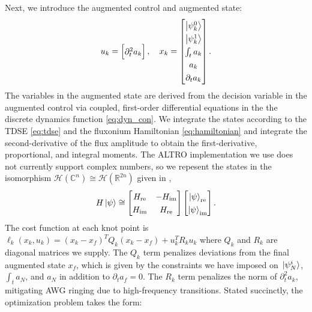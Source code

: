 Next, we introduce the augmented control and augmented state:
\begin{equation}
  \begingroup
  \renewcommand*{\arraystretch}{1.3}
  u_{k} = \begin{bmatrix} \partial^{2}_{t} a_{k} \end{bmatrix}, \quad
  x_{k} = \begin{bmatrix} \ket{\psi^{0}_{k}} \\ \ket{\psi^{1}_{k}}
    \\ \int_{t} a_{k} \\ a_{k} \\ \partial_{t} a_{k} \end{bmatrix}.
  \endgroup
  \label{eq:astatecontrols}
\end{equation}
The variables in the augmented state are derived from
the decision variable in the augmented
control via coupled, first-order differential equations in the 
the discrete dynamics function \eqref{eq:dyn_con}.
We integrate the states according to the TDSE \eqref{eq:tdse} and the
fluxonium Hamiltonian \eqref{eq:hamiltonian} and integrate
the second-derivative of the flux amplitude to obtain
the first-derivative, proportional, and integral moments.
The ALTRO implementation we use does not currently
support complex numbers, so we repesent the states
in the isomorphism $\mathcal{H}(\mathbb{C}^{n})
\cong \mathcal{H}(\mathbb{R}^{2n})$ given in \cite{leung2017speedup},
\begin{equation}
  H \ket{\psi} \cong \begin{bmatrix} H_{\textrm{re}} & -H_{\textrm{im}}
    \\ H_{\textrm{im}} & H_{\textrm{re}}\end{bmatrix}
  \begin{bmatrix} \ket{\psi}_{\textrm{re}} \\ \ket{\psi}_{\textrm{im}}\end{bmatrix}.
  \label{eq:isomorphism}
\end{equation}
The cost function at each knot point is
$\ell_{k}(x_{k}, u_{k}) = (x_{k} - x_{f})^{T} Q_{k} (x_{k} - x_{f}) + u^{T}_{k} R_{k} u_{k}$
where $Q_{k}$ and $R_{k}$ are diagonal matrices we supply. The $Q_{k}$ term
penalizes deviations from the final augmented state $x_{f}$,
which is given by the constraints we have imposed on
$\ket*{\psi^{i}_{N}}$, $\int_{t} a_{N}$, and $a_{N}$ in addition to
$\partial_{t} a_{f} = 0$. The $R_{k}$ term penalizes the norm of $\partial^{2}_{t} a_{k}$,
mitigating AWG ringing due to high-frequency transitions.
Stated succinctly, the optimization problem takes the form:
